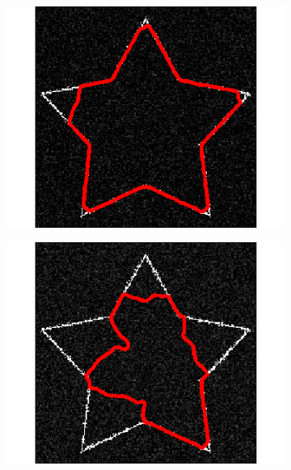\begin{appendices}
\begin{figure}[H]
\centering
\begin{subfigure}[c]{0.3\linewidth}
\centering
\includegraphics[width=\textwidth]{Chapters/Images/Noise/vfcg1}
\caption{}
\end{subfigure}
\begin{subfigure}[c]{0.3\linewidth}
\centering
\includegraphics[width=\textwidth]{Chapters/Images/Noise/vfcg5}
\caption{}
\end{subfigure}
\\
\begin{subfigure}[c]{0.3\linewidth}
\centering

\end{subfigure}
\end{figure}
\end{appendices}
